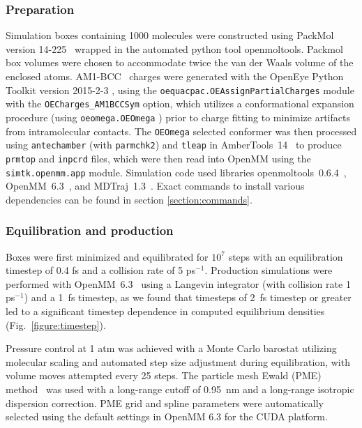 \documentclass[aps,pre,twocolumn,nofootinbib,superscriptaddress,linenumbers]{revtex4-1}
\begin{document}
\subsubsection{Preparation}
\label{section:preparation}

Simulation boxes containing 1000 molecules were constructed using PackMol version 14-225~\cite{martinez2009packmol, packmolurl} wrapped in the automated python tool openmoltools.
Packmol box volumes were chosen to accommodate twice the van der Waals volume of the enclosed atoms.  
AM1-BCC~\cite{am1bcc1,am1bcc2, velez2014time} charges were generated with the OpenEye Python Toolkit version 2015-2-3 \cite{openeye}, using the {\tt oequacpac.OEAssignPartialCharges} module with the {\tt OECharges\_AM1BCCSym} option, which utilizes a conformational expansion procedure (using {\tt oeomega.OEOmega} \cite{hawkins2012conformer}) prior to charge fitting to minimize artifacts from intramolecular contacts.  
The {\tt OEOmega} selected conformer was then processed using {\tt antechamber} (with {\tt parmchk2}) and {\tt tleap} in AmberTools~14~\cite{amber14} to produce {\tt prmtop} and {\tt inpcrd} files, which were then read into OpenMM using the {\tt simtk.openmm.app} module.
Simulation code used libraries openmoltools~0.6.4~\cite{openmoltools}, OpenMM~6.3~\cite{eastman2012openmm}, and MDTraj~1.3~\cite{mcgibbon2014mdtraj}.  
Exact commands to install various dependencies can be found in section \ref{section:commands}.

\subsubsection{Equilibration and production}
\label{section:production}

Boxes were first minimized and equilibrated for $10^7$ steps with an equilibration timestep of 0.4 fs and a collision rate of 5 ps$^{-1}$.  
Production simulations were performed with OpenMM~6.3~\cite{eastman2012openmm} using a Langevin integrator (with collision rate 1 ps$^{-1}$) and a 1~fs timestep, as we found that timesteps of 2~fs timestep or greater led to a significant timestep dependence in computed equilibrium densities (Fig.~\ref{figure:timestep}).  

Pressure control at 1 atm was achieved with a Monte Carlo barostat utilizing molecular scaling and automated step size adjustment during equilibration, with volume moves attempted every 25 steps.  
The particle mesh Ewald (PME) method~\cite{Darden1993} was used with a long-range cutoff of 0.95~nm and a long-range isotropic dispersion correction. 
PME grid and spline parameters were automatically selected using the default settings in OpenMM 6.3 for the CUDA platform.
\end{document}
